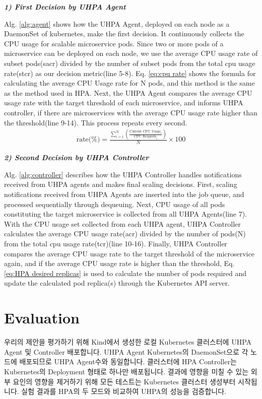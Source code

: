 \documentclass[conference]{IEEEtran}
\begin{document}
\noindent\textbf{\textit{1) First Decision by UHPA Agent}}
\par Alg. \ref{alg:agent} shows how the UHPA Agent, deployed on each node as a DaemonSet of kubernetes, make the first decision. It continuously collects the CPU usage for scalable microservice pods. Since two or more pods of a microservice can be deployed on each node, we use the average CPU usage rate of subset pods(sacr) divided by the number of subset pods from the total cpu usage rate(stcr) as our decision metric(line 5-8). Eq. \ref{eq:cpu rate} shows the formula for calculating the average CPU Usage rate for N pods, and this method is the same as the method used in HPA. Next, the UHPA Agent compares the average CPU usage rate with the target threshold of each microservice, and informs UHPA controller, if there are microservices with the average CPU usage rate higher than the threshold(line 9-14). This process repeats every second. \\

\begin{align}
    \text{rate(\%)} = {\frac{\sum_{i=1}^{N} \left( \frac{\text{Current CPU Usage}_i}{\text{CPU Requests}_i} \right)}{N} \times 100}
    \label{eq:cpu rate}
\end{align}

\noindent\textbf{\textit{2) Second Decision by UHPA Controller}}
\par Alg. \ref{alg:controller} describes how the UHPA Controller handles notifications received from UHPA agents and makes final scaling decisions. First, scaling notifications received from UHPA Agents are inserted into the job queue, and processed sequentially through dequeuing. Next, CPU usage of all pods constituting the target microservice is collected from all UHPA Agents(line 7). With the CPU usage set collected from each UHPA agent, UHPA Controller calculates the average CPU usage rate(acr) divided by the number of pods(N) from the total cpu usage rate(tcr)(line 10-16). Finally, UHPA Controller compares the average CPU usage rate to the target threshold of the microservice again, and if the average CPU usage rate is higher than the threshold, Eq. \ref{eq:HPA desired replicas} is used to calculate the number of pods required and update the calculated pod replica(s) through the Kubernetes API server.




\section{Evaluation}
우리의 제안을 평가하기 위해 Kind\cite{KindK8s}에서 생성한 로컬 Kubernetes 클러스터에 UHPA Agent 및 Controller 배포합니다. UHPA Agent Kubernetes의 DaemonSet으로 각 노드에 배포되므로 UHPA Agent수와 동일합니다. 클러스터에 HPA Controller는 Kubernetes의 Deployment 형태로 하나만 배포됩니다. 결과에 영향을 미칠 수 있는 외부 요인의 영향을 제거하기 위해 모든 테스트는 Kubernetes 클러스터 생성부터 시작됩니다. 실험 결과를 HPA의 두 모드와 비교하여 UHPA의 성능을 검증합니다.
\end{document}

